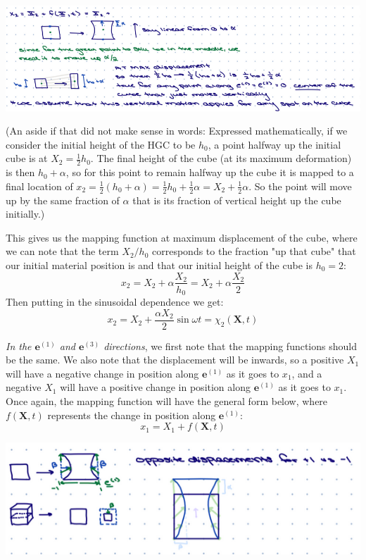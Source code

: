 \includegraphics[scale=0.9]{Dawson-figures/1.png}

(An aside if that did not make sense in words: Expressed mathematically, if we consider the initial height of the HGC to be $h_0$, a point halfway up the initial cube is at $X_2 = \frac{1}{2}h_0$. The final height of the cube (at its maximum deformation) is then $h_0 + \alpha$, so for this point to remain halfway up the cube it is mapped to a final location of $x_2 = \frac{1}{2}(h_0 + \alpha) = \frac{1}{2}h_0 + \frac{1}{2}\alpha = X_2 + \frac{1}{2}\alpha$. So the point will move up by the same fraction of $\alpha$ that is its fraction of vertical height up the cube initially.)

This gives us the mapping function at maximum displacement of the cube, where we can note that the term $X_2 / h_0$ corresponds to the fraction "up that cube" that our initial material position is and that our initial height of the cube is $h_0 = 2$:
\begin{equation}
    x_2 = X_2 + \alpha \frac{X_2}{h_0} = X_2 + \alpha \frac{X_2}{2}
\end{equation}
Then putting in the sinusoidal dependence we get:
\begin{equation}
    x_2 = X_2 + \frac{\alpha X_2}{2} \sin{\omega t} = \chi_2(\bm{X},t)
\end{equation}

\emph{In the $\bm{e}^{(1)}$ and $\bm{e}^{(3)}$ directions}, we first note that the mapping functions should be the same. We also note that the displacement will be inwards, so a positive $X_1$ will have a negative change in position along $\bm{e}^{(1)}$ as it goes to $x_1$, and a negative $X_1$ will have a positive change in position along $\bm{e}^{(1)}$ as it goes to $x_1$. Once again, the mapping function will have the general form below, where $f(\bm{X},t)$ represents the change in position along $\bm{e}^{(1)}$:
\begin{equation}
    x_1 = X_1 + f(\bm{X},t)
\end{equation}

\includegraphics{Dawson-figures/2.png}

